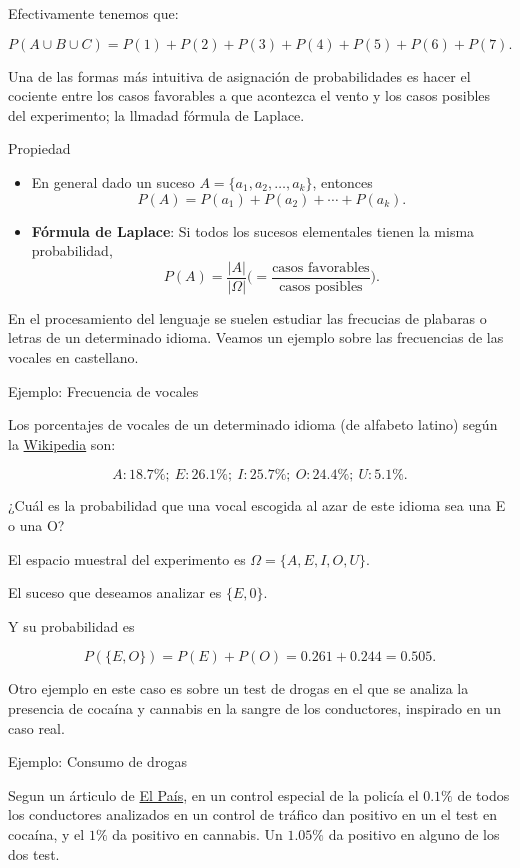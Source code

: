\documentclass[
  letterpaper,
  DIV=11,
  numbers=noendperiod]{scrreprt}
\begin{document}
Efectivamente tenemos que:

\[P(A\cup B\cup C)=P(1)+P(2)+P(3)+P(4)+P(5)+P(6)+P(7).\]

Una de las formas más intuitiva de asignación de probabilidades es hacer
el cociente entre los casos favorables a que acontezca el vento y los
casos posibles del experimento; la llmadad fórmula de Laplace.

Propiedad

\begin{itemize}
\item
  En general dado un suceso \(A=\{a_1,a_2,\ldots,a_k\}\), entonces \[
  P(A)=P(a_1)+P(a_2)+\cdots+P(a_k).
  \]
\item
  \textbf{Fórmula de Laplace}: Si todos los sucesos elementales tienen
  la misma probabilidad, \[
  P(A)=\frac{|A|}{|\Omega|}\Big(=\frac{\mbox{casos favorables}}{\mbox{casos posibles}}\Big).
  \]
\end{itemize}

En el procesamiento del lenguaje se suelen estudiar las frecucias de
plabaras o letras de un determinado idioma. Veamos un ejemplo sobre las
frecuencias de las vocales en castellano.

Ejemplo: Frecuencia de vocales

Los porcentajes de vocales de un determinado idioma (de alfabeto latino)
según la
\href{https://es.wikipedia.org/wiki/Frecuencia_de_aparici\%C3\%B3n_de_letras}{Wikipedia}
son:

\[A: 18.7\%;\ E: 26.1\%;\ I: 25.7\%;\ O: 24.4\%;\ U: 5.1\%.\]

¿Cuál es la probabilidad que una vocal escogida al azar de este idioma
sea una E o una O?

El espacio muestral del experimento es \(\Omega=\{A,E,I,O,U\}\).

El suceso que deseamos analizar es \(\{E,0\}\).

Y su probabilidad es

\[P(\{E,O\})=P(E)+P(O)=0.261+0.244=0.505.\]

Otro ejemplo en este caso es sobre un test de drogas en el que se
analiza la presencia de cocaína y cannabis en la sangre de los
conductores, inspirado en un caso real.

Ejemplo: Consumo de drogas

Segun un árticulo de
\href{https://elpais.com/politica/2019/01/02/actualidad/1546426491_623324.html}{El
País}, en un control especial de la policía el \(0.1\%\) de todos los
conductores analizados en un control de tráfico dan positivo en un el
test en cocaína, y el \(1\%\) da positivo en cannabis. Un \(1.05\%\) da
positivo en alguno de los dos test.
\end{document}
